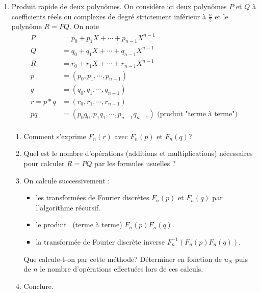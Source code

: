 \begin{enumerate}
\item Produit rapide de deux polynômes.\newline
On considère ici deux polynômes $P$ et $Q$ à coefficients réels ou complexes de degré strictement inférieur à $\frac{n}{2}$ et le polynôme $R=PQ$. On note 
\begin{align*}
 P&=p_0 + p_1 X +\cdots + p_{n-1}X^{n-1} \\
 Q&=q_0 + q_1 X +\cdots + q_{n-1}X^{n-1} \\
 R&=r_0 + r_1 X +\cdots + r_{n-1}X^{n-1} \\
 p &= (p_0,p_1,\cdots ,p_{n-1}) \\
 q &= (q_0,q_1,\cdots ,q_{n-1}) \\
 r=p*q &= (r_0,r_1,\cdots ,r_{n-1}) \\
 pq &= (p_0q_0,p_1q_1,\cdots ,p_{n-1}q_{n-1}) \text{ (produit "terme à terme")}\\
\end{align*}
\begin{enumerate}
 \item Comment s'exprime $F_n(r)$ avec $F_n(p)$ et $F_n(q)$?
 \item Quel est le nombre d'opérations (additions et multiplications) nécessaires pour calculer $R=PQ$ par les formules usuelles ?
\item On calcule successivement :
\begin{itemize}
 \item les transformées de Fourier discrètes  $F_n(p)$ et $F_n(q)$ par l'algorithme récursif.
 \item le \og produit\fg~ (terme à terme) $F_n(p)F_n(q)$.
 \item la transformée de Fourier discrète inverse $F_n^{-1}(F_n(p)F_n(q))$.
\end{itemize}
Que calcule-t-on par cette méthode? Déterminer en fonction de $u_N$ puis de $n$ le nombre d'opérations effectuées lors de ces calculs.
\item Conclure.
\end{enumerate}

\end{enumerate}


